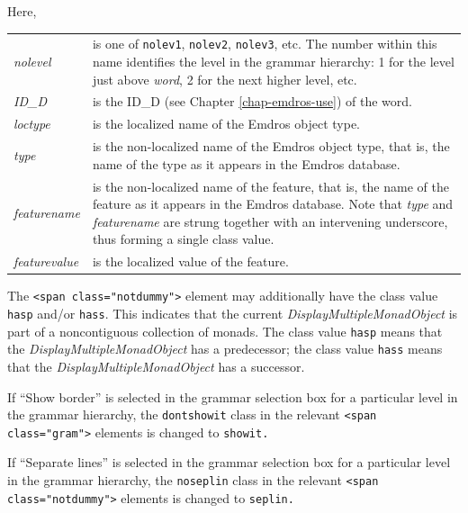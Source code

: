 \documentclass[11pt,oneside,a4paper]{memoir}
\newcommand*{\xml}[1]{\texttt{<#1>}}
\newcommand*{\xmla}[1]{\texttt{#1}} %
\begin{document}
\begin{minipage}{\textwidth}
Here,

\begin{tabu}{>{\itshape}lX}
nolevel & is one of \xmla{nolev1}, \xmla{nolev2}, \xmla{nolev3}, etc. The number within this
          name identifies the level in the grammar hierarchy: 1 for the level just above
          \emph{word}, 2 for the next higher level, etc.\\

ID\_D & is the ID\_D (see Chapter \ref{chap-emdros-use}) of the word.\\

loctype & is the localized name of the Emdros object type.\\

type & is the non-localized name of the Emdros object type, that is, the name of the type as it
appears in the Emdros database.\\

featurename & is the non-localized name of the feature, that is, the name of the feature as it
appears in the Emdros database. Note that \emph{type} and \emph{featurename} are strung together
with an intervening underscore, thus forming a single class value.\\

featurevalue & is the localized value of the feature.\\
\end{tabu}
\end{minipage}

The \xml{span class="notdummy"} element may additionally have the class value \xmla{hasp}
and/or \xmla{hass}. This indicates that the current \emph{DisplayMultipleMonadObject} is part of a
noncontiguous collection of monads. The class value \xmla{hasp} means that the
\emph{DisplayMultipleMonadObject} has a predecessor; the class value \xmla{hass} means that the
\emph{DisplayMultipleMonadObject} has a successor.


If ``Show border'' is selected in the grammar selection box for a
particular level in the grammar hierarchy, the \xmla{dontshowit} class in the relevant \xml{span
  class="gram"} elements is changed to \xmla{showit.}

If ``Separate lines'' is selected in the grammar selection box for a
particular level in the grammar hierarchy, the \xmla{noseplin} class in the relevant \xml{span
  class="notdummy"} elements is changed to \xmla{seplin.}
\end{document}
